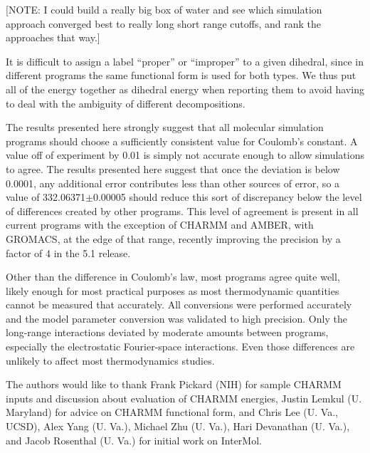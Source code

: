 [NOTE: I could build a really big box of water and see which
  simulation approach converged best to really long short range
  cutoffs, and rank the approaches that way.]

It is difficult to assign a label ``proper'' or ``improper'' to a
given dihedral, since in different programs the same functional form
is used for both types. We thus put all of the energy together as
dihedral energy when reporting them to avoid having to deal with the
ambiguity of different decompositions.

The results presented here strongly suggest that all molecular
simulation programs should choose a sufficiently consistent value for
Coulomb's constant. A value off of experiment by 0.01 is simply not
accurate enough to allow simulations to agree.  The results presented
here suggest that once the deviation is below 0.0001, any additional
error contributes less than other sources of error, so a value of
332.06371$\pm$0.00005 should reduce this sort of discrepancy below the
level of differences created by other programs.  This level of
agreement is present in all current programs with the exception of
CHARMM and AMBER, with GROMACS, at the edge of that range, recently
improving the precision by a factor of 4 in the 5.1 release.

Other than the difference in Coulomb's law, most programs agree quite
well, likely enough for most practical purposes as most thermodynamic
quantities cannot be measured that accurately.  All conversions were
performed accurately and the model parameter conversion was validated
to high precision. Only the long-range interactions deviated by
moderate amounts between programs, especially the electrostatic
Fourier-space interactions.  Even those differences are unlikely to
affect most thermodynamics studies.


\begin{acknowledgements}
The authors would like to thank Frank Pickard (NIH) for sample CHARMM
inputs and discussion about evaluation of CHARMM energies, Justin
Lemkul (U. Maryland) for advice on CHARMM functional form, and Chris
Lee (U. Va., UCSD), Alex Yang (U. Va.), Michael Zhu (U. Va.), Hari Devanathan (U. Va.),
and Jacob Rosenthal (U. Va.)  for initial work on InterMol.
\end{acknowledgements}



